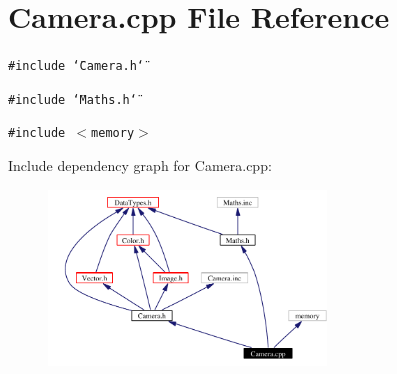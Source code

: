\section{Camera.cpp File Reference}
\label{Camera_8cpp}
{\tt \#include \char`\"{}Camera.h\char`\"{}}\par
{\tt \#include \char`\"{}Maths.h\char`\"{}}\par
{\tt \#include $<$memory$>$}\par


Include dependency graph for Camera.cpp:\begin{figure}[H]
\begin{center}
\leavevmode
\includegraphics[width=209pt]{Camera_8cpp__incl}
\end{center}
\end{figure}
